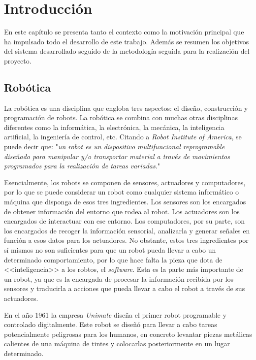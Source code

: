 \chapter{Introducción}

En este capítulo se presenta tanto el contexto como la motivación principal que ha impulsado todo el desarrollo de este trabajo. Además se resumen los objetivos del sistema desarrollado seguido de la metodología seguida para la realización del proyecto.

\section{Robótica}
\label{sec:robotica}

La robótica es una disciplina que engloba tres aspectos: el diseño, construcción y programación de robots. La robótica se combina con muchas otras disciplinas diferentes como la informática, la electrónica, la mecánica, la inteligencia artificial, la ingeniería de control, etc. Citando a \textit{Robot Institute of America}, se puede decir que: "\textit{un robot es un dispositivo multifuncional reprogramable diseñado para manipular y/o transportar material a través de movimientos programados para la realización de tareas variadas}."

Esencialmente, los robots se componen de sensores, actuadores y computadores, por lo que se puede considerar un robot como cualquier sistema informático o máquina que disponga de esos tres ingredientes. Los sensores son los encargados de obtener información del entorno que rodea al robot. Los actuadores son los encargados de interactuar con ese entorno. Los computadores, por su parte, son los encargados de recoger la información sensorial, analizarla y generar señales en función a esos datos para los actuadores. No obstante, estos tres ingredientes por sí mismos no son suficientes para que un robot pueda llevar a cabo un determinado comportamiento, por lo que hace falta la pieza que dota de <<inteligencia>> a los robtos, el \textit{software}. Esta es la parte más importante de un robot, ya que es la encargada de procesar la información recibida por los sensores y traducirla a acciones que pueda llevar a cabo el robot a través de sus actuadores.

En el año 1961 la empresa \textit{Unimate} diseña el primer robot programable y controlado digitalmente. Este robot se diseñó para llevar a cabo tareas potencialmente peligrosas para los humanos, en concreto levantar piezas metálicas calientes de una máquina de tintes y colocarlas posteriormente en un lugar determinado.

